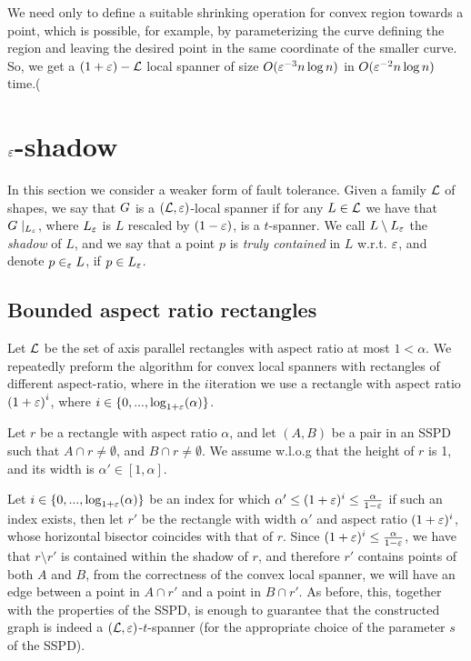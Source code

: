 \documentclass[12pt]{article}%
\begin{document}
We need only to define a suitable shrinking operation for convex
region towards a point, which is possible, for example, by
parameterizing the curve defining the region and leaving the desired
point in the same coordinate of the smaller curve. So, we get a
$(1+\varepsilon)-\mathcal{L}$ local spanner of size $O(\varepsilon^{-3}n\log n)$ in
$O(\varepsilon^{-2}n\log n)$ time.(


\section{$\varepsilon$-shadow}

In this section we consider a weaker form of fault tolerance. Given a
family $\mathcal{L}$ of shapes, we say that $G$ is a $(\mathcal{L},\varepsilon)$-local
spanner if for any $L\in\mathcal{L}$ we have that $G\mid_{L_{\varepsilon}}$, where
$L_{\varepsilon}$ is $L$ rescaled by $(1-\varepsilon)$, is a $t$-spanner. We call
$L\setminus L_{\varepsilon}$ the \emph{shadow} of $L$, and we say that a
point $p$ is \emph{truly contained} in $L$ w.r.t. $\varepsilon$, and denote
$p\in_{\varepsilon} L$, if $p\in L_{\varepsilon}$.

\subsection{Bounded aspect ratio rectangles}
Let $\mathcal{L}$ be the set of axis parallel rectangles with aspect ratio at
most $1<\alpha$. We repeatedly preform the algorithm for convex local
spanners with rectangles of different aspect-ratio, where in the
$i$\th iteration we use a rectangle with aspect ratio
$\left(1+\varepsilon\right)^i$, where $i\in\{0,...,\log_{1+\varepsilon}(\alpha)\}$.

Let $r$ be a rectangle with aspect ratio $\alpha$, and let $(A,B)$ be
a pair in an SSPD such that $A\cap r\neq \emptyset$, and
$B\cap r\neq \emptyset$. We assume w.l.o.g that the height of $r$ is
1, and its width is $\alpha'\in [1,\alpha]$.

Let $i\in \{0,...,\log_{1+\varepsilon}(\alpha)\}$ be an index for which
$\alpha' \leq (1+\varepsilon)^i \leq \frac{\alpha}{1-\varepsilon}$ if such an index
exists, then let $r'$ be the rectangle with width $\alpha'$ and aspect
ratio $(1+\varepsilon)^i$, whose horizontal bisector coincides with that of
$r$. Since $(1+\varepsilon)^i \leq \frac{\alpha}{1-\varepsilon}$, we have that
$r\setminus r'$ is contained within the shadow of $r$, and therefore
$r'$ contains points of both $A$ and $B$, from the correctness of the
convex local spanner, we will have an edge between a point in
$A\cap r'$ and a point in $B\cap r'$. As before, this, together with
the properties of the SSPD, is enough to guarantee that the
constructed graph is indeed a $(\mathcal{L}, \varepsilon)$-$t$-spanner (for the
appropriate choice of the parameter $s$ of the SSPD).
\end{document}
